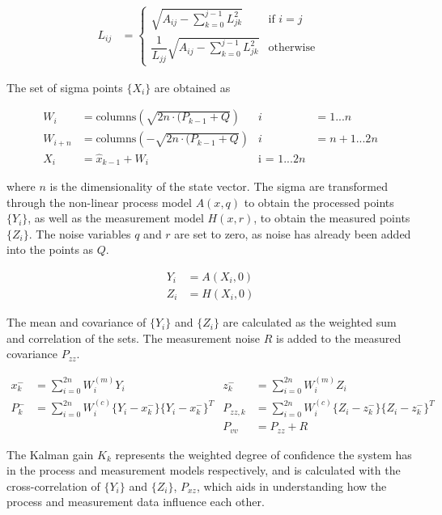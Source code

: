 \begin{align}
    L_{ij} &= \left\{ \begin{array}{ll}
        \sqrt{A_{ij} - \sum_{k=0}^{j-1} L_{jk}^2} & \text{if } i = j \\
        \dfrac{1}{L_{jj}} \sqrt{A_{ij} - \sum_{k=0}^{j-1} L_{jk}^2} & \text{otherwise }
    \end{array}
    \right.
\end{align}

The set of sigma points $\{X_i\}$ are obtained as

\begin{align}
    W_i &= \text{columns}(\sqrt{2n \cdot (P_{k-1}+ Q}) & i &= 1...n \\
    W_{i+n} &= \text{columns}(-\sqrt{2n \cdot (P_{k-1}+ Q})  & i &= n+1...2n\\
    X_i &= \hat{x}_{k-1} + W_i & \text{i = $1$...$2n$}
\end{align}

where $n$ is the dimensionality of the state vector. The sigma are transformed through the non-linear process model $A(x, q)$ to obtain the processed points $\{Y_i\}$, as well as the measurement model $H(x, r)$, to obtain the measured points $\{Z_i\}$. The noise variables $q$ and $r$ are set to zero, as noise has already been added into the points as $Q$.

\begin{align}
    Y_i &= A(X_i, 0) \\
    Z_i &= H(X_i, 0) 
\end{align}

The mean and covariance of $\{Y_i\}$ and $\{Z_i\}$ are calculated as the weighted sum and correlation of the sets. The measurement noise $R$ is added to the measured covariance $P_{zz}$.

\begin{align}
    x_k^{-} &= \sum_{i=0}^{2n}W_i^{(m)} Y_i & z_k^{-} &= \sum_{i=0}^{2n}W_i^{(m)} Z_i \\
    P_k^{-} &= \sum_{i=0}^{2n}W_i^{(c)} \{Y_i - x_k^{-}\}\{Y_i - x_k^{-}\}^T & P_{zz,k} &= \sum_{i=0}^{2n}W_i^{(c)} \{Z_i - z_k^{-}\}\{Z_i - z_k^{-}\}^T \\
    & & P_{vv} &= P_{zz} + R
\end{align}

The Kalman gain $K_k$ represents the weighted degree of confidence the system has in the process and measurement models respectively, and is calculated with the cross-correlation of $\{Y_i\}$ and $\{Z_i\}$, $P_{xz}$, which aids in understanding how the process and measurement data influence each other.

